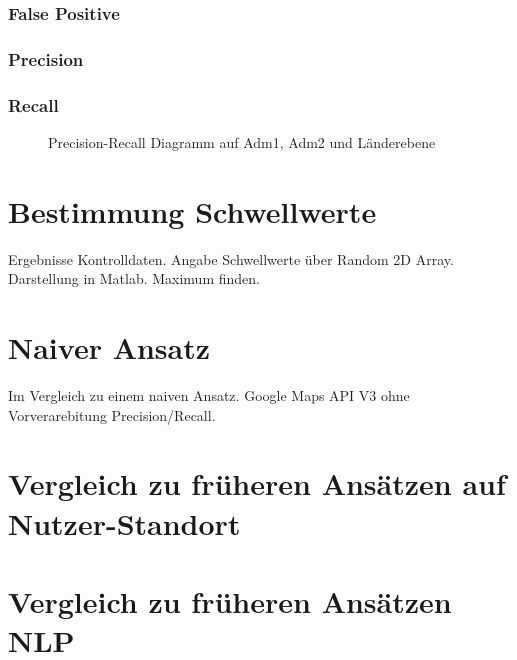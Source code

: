 			\subsubsection{False Positive}  

			\subsubsection{Precision}  

			\subsubsection{Recall} 

			\begin{figure}[!ht]
	
						\centering
						\caption{Precision-Recall Diagramm auf Adm1, Adm2 und Länderebene}
						\label{img:relHaufBsp}
					
				\end{figure}

	\section{Bestimmung Schwellwerte} 
		
		Ergebnisse Kontrolldaten.
		Angabe Schwellwerte über Random 2D Array. 
		Darstellung in Matlab.
		Maximum finden. 

	\section{Naiver Ansatz}
		
		Im Vergleich zu einem naiven Ansatz.
		Google Maps API V3 ohne Vorverarebitung 
		Precision/Recall. 


	\section{Vergleich zu früheren Ansätzen auf Nutzer-Standort}
		

	\section{Vergleich zu früheren Ansätzen NLP}
		
